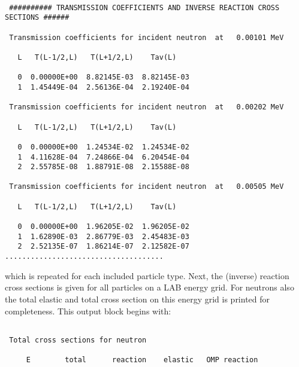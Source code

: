 \begin{samplecase}
{\small \begin{verbatim}

 ########## TRANSMISSION COEFFICIENTS AND INVERSE REACTION CROSS SECTIONS ######
 
 Transmission coefficients for incident neutron  at   0.00101 MeV
 
   L   T(L-1/2,L)   T(L+1/2,L)    Tav(L)  
  
   0  0.00000E+00  8.82145E-03  8.82145E-03
   1  1.45449E-04  2.56136E-04  2.19240E-04
  
 Transmission coefficients for incident neutron  at   0.00202 MeV
  
   L   T(L-1/2,L)   T(L+1/2,L)    Tav(L)
  
   0  0.00000E+00  1.24534E-02  1.24534E-02
   1  4.11628E-04  7.24866E-04  6.20454E-04
   2  2.55785E-08  1.88791E-08  2.15588E-08
  
 Transmission coefficients for incident neutron  at   0.00505 MeV
  
   L   T(L-1/2,L)   T(L+1/2,L)    Tav(L)
  
   0  0.00000E+00  1.96205E-02  1.96205E-02
   1  1.62890E-03  2.86779E-03  2.45483E-03
   2  2.52135E-07  1.86214E-07  2.12582E-07
.....................................
\end{verbatim} } \renewcommand{\baselinestretch}{1.07}\small\normalsize
\noindent
which is repeated for each included particle type.
Next, the (inverse) reaction cross sections 
is given for all particles on a LAB energy grid. For neutrons also the total 
elastic and total cross section on this energy grid is printed for completeness.
This output block begins with:

{\small \begin{verbatim}

 Total cross sections for neutron
 
     E        total      reaction    elastic   OMP reaction
 

\end{verbatim}}
\end{samplecase}
